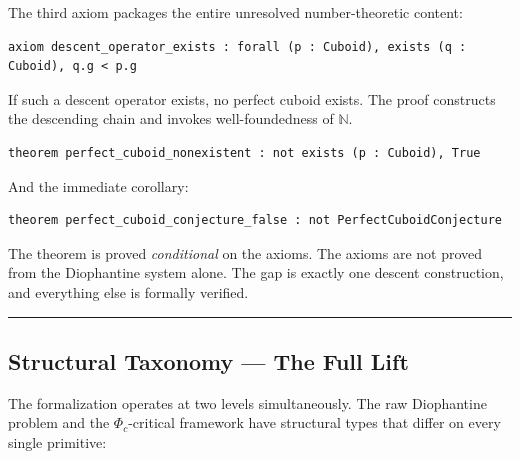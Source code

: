 \documentclass[12pt,a4paper]{article}
\begin{document}
The third axiom packages the entire unresolved number-theoretic content:

\begin{lstlisting}[language=lean]
axiom descent_operator_exists : forall (p : Cuboid), exists (q : Cuboid), q.g < p.g
\end{lstlisting}

If such a descent operator exists, no perfect cuboid exists. The proof constructs the descending chain and invokes well-foundedness of $\mathbb{N}$.

\begin{lstlisting}[language=lean]
theorem perfect_cuboid_nonexistent : not exists (p : Cuboid), True
\end{lstlisting}

And the immediate corollary:

\begin{lstlisting}[language=lean]
theorem perfect_cuboid_conjecture_false : not PerfectCuboidConjecture
\end{lstlisting}

The theorem is proved \emph{conditional} on the axioms. The axioms are not proved from the Diophantine system alone. The gap is exactly one descent construction, and everything else is formally verified.

\begin{center}
\rule{0.5\textwidth}{0.4pt}
\end{center}

\subsection{Structural Taxonomy --- The Full Lift}

The formalization operates at two levels simultaneously. The raw Diophantine problem and the $\Phi_c$-critical framework have structural types that differ on every single primitive:
\end{document}

